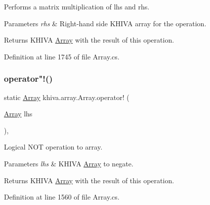 Performs a matrix multiplication of lhs and rhs. 


\begin{DoxyParams}{Parameters}
{\em rhs} & Right-\/hand side K\+H\+I\+VA array for the operation.\\
\hline
\end{DoxyParams}
\begin{DoxyReturn}{Returns}
K\+H\+I\+VA \mbox{\hyperlink{classkhiva_1_1array_1_1_array}{Array}} with the result of this operation.
\end{DoxyReturn}


Definition at line 1745 of file Array.\+cs.

\mbox{\label{classkhiva_1_1array_1_1_array_a49651c727023f9b2160bc32265c37394}} 
\subsubsection{\texorpdfstring{operator"!()}{operator!()}}
{\footnotesize\ttfamily static \mbox{\hyperlink{classkhiva_1_1array_1_1_array}{Array}} khiva.\+array.\+Array.\+operator! (\begin{DoxyParamCaption}\item[{\mbox{\hyperlink{classkhiva_1_1array_1_1_array}{Array}}}]{lhs }\end{DoxyParamCaption})\hspace{0.3cm}{\ttfamily [inline]}, {\ttfamily [static]}}



Logical N\+OT operation to array. 


\begin{DoxyParams}{Parameters}
{\em lhs} & K\+H\+I\+VA \mbox{\hyperlink{classkhiva_1_1array_1_1_array}{Array}} to negate.\\
\hline
\end{DoxyParams}
\begin{DoxyReturn}{Returns}
K\+H\+I\+VA \mbox{\hyperlink{classkhiva_1_1array_1_1_array}{Array}} with the result of this operation.
\end{DoxyReturn}


Definition at line 1560 of file Array.\+cs.

\mbox{\label{classkhiva_1_1array_1_1_array_a1533f8e4ae260226062c753da4376f42}} 
